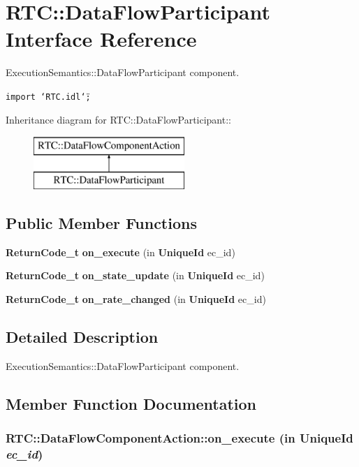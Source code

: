 \section{RTC::Data\-Flow\-Participant Interface Reference}
\label{interfaceRTC_1_1DataFlowParticipant}
Execution\-Semantics::Data\-Flow\-Participant component.  


{\tt import \char`\"{}RTC.idl\char`\"{};}

Inheritance diagram for RTC::Data\-Flow\-Participant::\begin{figure}[H]
\begin{center}
\leavevmode
\includegraphics[height=2cm]{interfaceRTC_1_1DataFlowParticipant}
\end{center}
\end{figure}
\subsection*{Public Member Functions}
\begin{CompactItemize}
\item 
{\bf Return\-Code\_\-t} {\bf on\_\-execute} (in {\bf Unique\-Id} ec\_\-id)
\item 
{\bf Return\-Code\_\-t} {\bf on\_\-state\_\-update} (in {\bf Unique\-Id} ec\_\-id)
\item 
{\bf Return\-Code\_\-t} {\bf on\_\-rate\_\-changed} (in {\bf Unique\-Id} ec\_\-id)
\end{CompactItemize}


\subsection{Detailed Description}
Execution\-Semantics::Data\-Flow\-Participant component. 



\subsection{Member Function Documentation}
\subsubsection{ RTC::Data\-Flow\-Component\-Action::on\_\-execute (in {\bf Unique\-Id} {\em ec\_\-id})\hspace{0.3cm}{\tt  [inherited]}}\label{interfaceRTC_1_1DataFlowComponentAction_RTC_1_1DataFlowParticipanta0}


